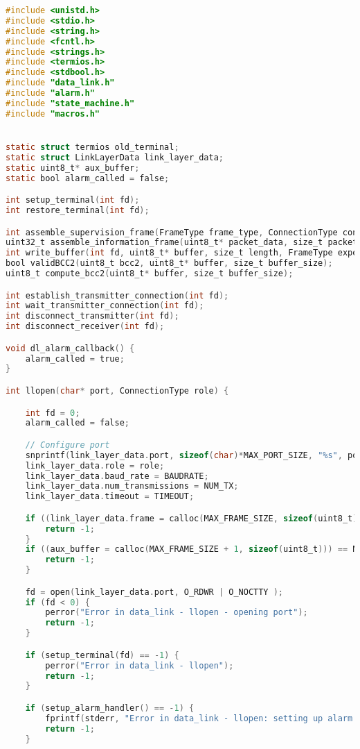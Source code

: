 \begin{lstlisting}[language=C, caption=data_link.c]
#include <unistd.h>
#include <stdio.h>
#include <string.h>
#include <fcntl.h>
#include <strings.h>
#include <termios.h>
#include <stdbool.h>
#include "data_link.h"
#include "alarm.h"
#include "state_machine.h"
#include "macros.h"


static struct termios old_terminal;
static struct LinkLayerData link_layer_data;
static uint8_t* aux_buffer;
static bool alarm_called = false;

int setup_terminal(int fd);
int restore_terminal(int fd);

int assemble_supervision_frame(FrameType frame_type, ConnectionType connection_type, uint8_t* frame_buffer);
uint32_t assemble_information_frame(uint8_t* packet_data, size_t packet_size, uint8_t* frame, uint8_t frame_number);
int write_buffer(int fd, uint8_t* buffer, size_t length, FrameType expected_response);
bool validBCC2(uint8_t bcc2, uint8_t* buffer, size_t buffer_size);
uint8_t compute_bcc2(uint8_t* buffer, size_t buffer_size);

int establish_transmitter_connection(int fd);
int wait_transmitter_connection(int fd);
int disconnect_transmitter(int fd);
int disconnect_receiver(int fd);

void dl_alarm_callback() {
    alarm_called = true;
}

int llopen(char* port, ConnectionType role) {

    int fd = 0;
    alarm_called = false;

    // Configure port
    snprintf(link_layer_data.port, sizeof(char)*MAX_PORT_SIZE, "%s", port);
    link_layer_data.role = role;
    link_layer_data.baud_rate = BAUDRATE;
    link_layer_data.num_transmissions = NUM_TX;
    link_layer_data.timeout = TIMEOUT;

    if ((link_layer_data.frame = calloc(MAX_FRAME_SIZE, sizeof(uint8_t))) == NULL) {
        return -1;
    }
    if ((aux_buffer = calloc(MAX_FRAME_SIZE + 1, sizeof(uint8_t))) == NULL) {
        return -1;
    }

    fd = open(link_layer_data.port, O_RDWR | O_NOCTTY );
    if (fd < 0) {
        perror("Error in data_link - llopen - opening port");
        return -1;
    } 

    if (setup_terminal(fd) == -1) {
        perror("Error in data_link - llopen");
        return -1;
    }

    if (setup_alarm_handler() == -1) {
        fprintf(stderr, "Error in data_link - llopen: setting up alarm handler\n");
        return -1;
    }


\end{lstlisting}
